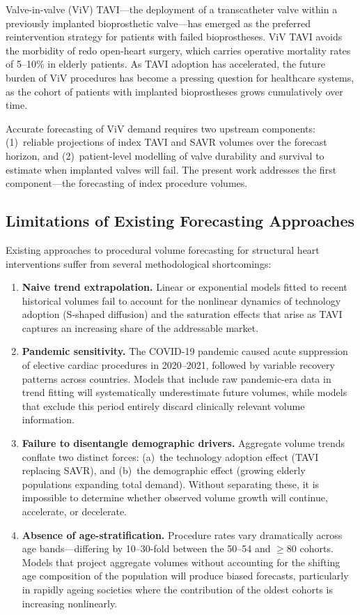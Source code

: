 \documentclass[12pt, a4paper]{article}
\begin{document}
Valve-in-valve (ViV) TAVI---the deployment of a transcatheter valve within a previously implanted bioprosthetic valve---has emerged as the preferred reintervention strategy for patients with failed bioprostheses. ViV TAVI avoids the morbidity of redo open-heart surgery, which carries operative mortality rates of 5--10\% in elderly patients. As TAVI adoption has accelerated, the future burden of ViV procedures has become a pressing question for healthcare systems, as the cohort of patients with implanted bioprostheses grows cumulatively over time.

Accurate forecasting of ViV demand requires two upstream components: (1)~reliable projections of index TAVI and SAVR volumes over the forecast horizon, and (2)~patient-level modelling of valve durability and survival to estimate when implanted valves will fail. The present work addresses the first component---the forecasting of index procedure volumes.

\subsection{Limitations of Existing Forecasting Approaches}

Existing approaches to procedural volume forecasting for structural heart interventions suffer from several methodological shortcomings:

\begin{enumerate}[leftmargin=*, itemsep=4pt]
    \item \textbf{Naive trend extrapolation.} Linear or exponential models fitted to recent historical volumes fail to account for the nonlinear dynamics of technology adoption (S-shaped diffusion) and the saturation effects that arise as TAVI captures an increasing share of the addressable market.

    \item \textbf{Pandemic sensitivity.} The COVID-19 pandemic caused acute suppression of elective cardiac procedures in 2020--2021, followed by variable recovery patterns across countries. Models that include raw pandemic-era data in trend fitting will systematically underestimate future volumes, while models that exclude this period entirely discard clinically relevant volume information.

    \item \textbf{Failure to disentangle demographic drivers.} Aggregate volume trends conflate two distinct forces: (a)~the technology adoption effect (TAVI replacing SAVR), and (b)~the demographic effect (growing elderly populations expanding total demand). Without separating these, it is impossible to determine whether observed volume growth will continue, accelerate, or decelerate.

    \item \textbf{Absence of age-stratification.} Procedure rates vary dramatically across age bands---differing by 10--30-fold between the 50--54 and $\geq$80 cohorts. Models that project aggregate volumes without accounting for the shifting age composition of the population will produce biased forecasts, particularly in rapidly ageing societies where the contribution of the oldest cohorts is increasing nonlinearly.
\end{enumerate}
\end{document}
